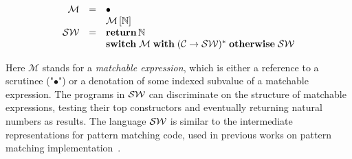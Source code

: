 \[
\begin{array}{rcl}
 \mathcal M & = & \bullet \\
            &   & \mathcal M\,[\mathbb{N}] \\
 \mathcal{S}\mathcal{W} & = & \mathbf{return}\,\mathbb{N} \\
            &   & \mathbf{switch}\;\mathcal{M}\;\mathbf{with}\; (\mathcal{C}\; \mathbf{\rightarrow}\; \mathcal{S}\mathcal{W})^*\;\mathbf{otherwise}\;\mathcal{S}\mathcal{W}
\end{array}
\] 
\begin{comment}
 \[
 \begin{array}{rcl}
   \mathcal M & = & \bullet \\
              &   & \mathcal M\,[\mathbb{N}] \\
   \ir & = & \primi{return}\,\mathbb{N} \\
              &   & \primi{if}\;\mathcal{C}\;\mathcal{M}\;\primi{then}\;\ir\;\primi{else}\;\ir
 \end{array}
 \]
\end{comment}

 Here $\mathcal{M}$ stands for a \emph{matchable expression}, which is either a reference to a scrutinee ("$\bullet$") or
 a denotation of some indexed subvalue of a matchable expression. The programs in $\mathcal{S}\mathcal{W}$ can discriminate on the
 structure of matchable expressions, testing their top constructors and eventually returning natural numbers as results.
 The language $\mathcal{S}\mathcal{W}$ is similar to the intermediate representations for pattern matching code, used in 
 previous works on pattern matching implementation~\cite{maranget2001,maranget2008}.
 

